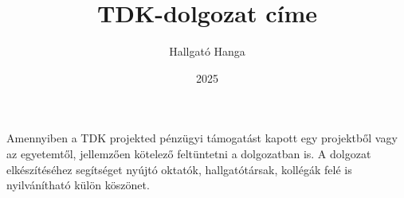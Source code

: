 \documentclass[
]{oeniktdk}[2024/04/26]
\title{TDK-dolgozat címe}
\date{2025}
\author{Hallgató Hanga}
\affiliation{egyetemi tanársegéd}
\begin{document}


\makecover
\cleardoublepage
\maketitle

\tableofcontents
\cleardoublepage


\cleardoublepage


\cleardoublepage


\cleardoublepage


\cleardoublepage

\chapter*{\acklabel}
Amennyiben a TDK projekted pénzügyi támogatást kapott egy projektből vagy az egyetemtől, jellemzően kötelező feltüntetni a dolgozatban is. A dolgozat elkészítéséhez segítséget nyújtó oktatók, hallgatótársak, kollégák felé is nyilvánítható külön köszönet.

\appendix

\cleardoublepage

{}
\printbibliography[title=\biblabel]
\cleardoublepage

{}
\listoffigures
\cleardoublepage

{}
\listoftables
\cleardoublepage

{}
\listofalgorithms
\cleardoublepage

{}
\lstlistoflistings
\cleardoublepage

\end{document}

